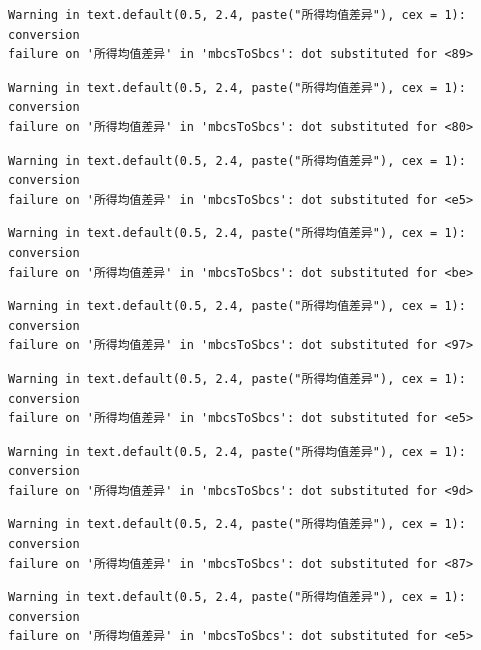 \documentclass[
  letterpaper,
  DIV=11,
  numbers=noendperiod]{scrreprt}
\begin{document}
\begin{verbatim}
Warning in text.default(0.5, 2.4, paste("所得均值差异"), cex = 1): conversion
failure on '所得均值差异' in 'mbcsToSbcs': dot substituted for <89>
\end{verbatim}

\begin{verbatim}
Warning in text.default(0.5, 2.4, paste("所得均值差异"), cex = 1): conversion
failure on '所得均值差异' in 'mbcsToSbcs': dot substituted for <80>
\end{verbatim}

\begin{verbatim}
Warning in text.default(0.5, 2.4, paste("所得均值差异"), cex = 1): conversion
failure on '所得均值差异' in 'mbcsToSbcs': dot substituted for <e5>
\end{verbatim}

\begin{verbatim}
Warning in text.default(0.5, 2.4, paste("所得均值差异"), cex = 1): conversion
failure on '所得均值差异' in 'mbcsToSbcs': dot substituted for <be>
\end{verbatim}

\begin{verbatim}
Warning in text.default(0.5, 2.4, paste("所得均值差异"), cex = 1): conversion
failure on '所得均值差异' in 'mbcsToSbcs': dot substituted for <97>
\end{verbatim}

\begin{verbatim}
Warning in text.default(0.5, 2.4, paste("所得均值差异"), cex = 1): conversion
failure on '所得均值差异' in 'mbcsToSbcs': dot substituted for <e5>
\end{verbatim}

\begin{verbatim}
Warning in text.default(0.5, 2.4, paste("所得均值差异"), cex = 1): conversion
failure on '所得均值差异' in 'mbcsToSbcs': dot substituted for <9d>
\end{verbatim}

\begin{verbatim}
Warning in text.default(0.5, 2.4, paste("所得均值差异"), cex = 1): conversion
failure on '所得均值差异' in 'mbcsToSbcs': dot substituted for <87>
\end{verbatim}

\begin{verbatim}
Warning in text.default(0.5, 2.4, paste("所得均值差异"), cex = 1): conversion
failure on '所得均值差异' in 'mbcsToSbcs': dot substituted for <e5>
\end{verbatim}
\end{document}
